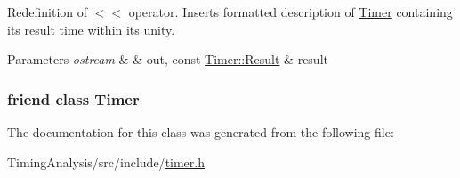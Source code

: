 Redefinition of $<$$<$ operator. Inserts formatted description of \hyperlink{classTimer}{Timer} containing its result time within its unity. 


\begin{DoxyParams}{Parameters}
{\em ostream} & \& out, const \hyperlink{classTimer_1_1Result}{Timer\-::\-Result} \& result \\
\hline
\end{DoxyParams}
\hypertarget{classTimer_1_1Result_a50de43af5bed41f30c071d8cce0e81bc}{
\subsubsection[{Timer}]{\setlength{\rightskip}{0pt plus 5cm}friend class {\bf Timer}\hspace{0.3cm}{\ttfamily [friend]}}}\label{classTimer_1_1Result_a50de43af5bed41f30c071d8cce0e81bc}


The documentation for this class was generated from the following file\-:\begin{DoxyCompactItemize}
\item 
Timing\-Analysis/src/include/\hyperlink{timer_8h}{timer.\-h}\end{DoxyCompactItemize}
